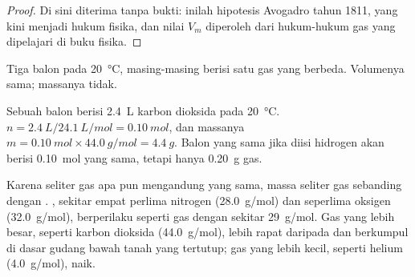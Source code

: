 \begin{proof}
Di sini diterima tanpa bukti: inilah hipotesis Avogadro tahun 1811, yang
kini menjadi hukum fisika, dan nilai $V_m$ diperoleh dari hukum-hukum gas
yang dipelajari di buku fisika.
\end{proof}

\begin{omfigure}

{\small Tiga balon pada \qty{20}{\celsius}, masing-masing berisi satu
 gas yang berbeda. Volumenya sama; massanya tidak.}
\end{omfigure}


\begin{example}\label{ex:g10:the-mole:balloon}
Sebuah balon berisi \qty{2.4}{L} karbon dioksida pada \qty{20}{\celsius}.
 $n = \qty{2.4}{L} / \qty{24.1}{L/mol} = \qty{0.10}{mol}$,
dan massanya $m = \qty{0.10}{mol} \times \qty{44.0}{g/mol} =
\qty{4.4}{g}$. Balon yang sama jika diisi hidrogen akan berisi
\qty{0.10}{mol} yang sama, tetapi hanya \qty{0.20}{g} gas.
\end{example}

\begin{remark}\label{rem:g10:the-mole:heavy}
Karena seliter gas apa pun mengandung  yang sama, massa
seliter gas sebanding dengan . ,  sekitar
empat perlima nitrogen (\qty{28.0}{g/mol}) dan seperlima oksigen
(\qty{32.0}{g/mol}), berperilaku seperti gas dengan  sekitar
\qty{29}{g/mol}. Gas yang  lebih besar, seperti karbon
dioksida (\qty{44.0}{g/mol}), lebih rapat daripada  dan berkumpul di
dasar gudang bawah tanah yang tertutup; gas yang  lebih
kecil, seperti helium (\qty{4.0}{g/mol}), naik.
\end{remark}

